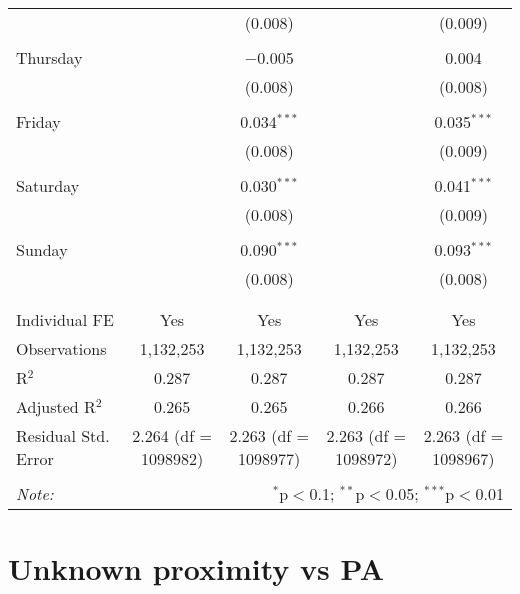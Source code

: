 \documentclass[
]{article}
\begin{document}
\begin{table}[!htbp]
{\begin{tabular}{@{\extracolsep{5pt}}lcccc}
  &  & (0.008) &  & (0.009) \\ 
  & & & & \\ 
 Thursday &  & $-$0.005 &  & 0.004 \\ 
  &  & (0.008) &  & (0.008) \\ 
  & & & & \\ 
 Friday &  & 0.034$^{***}$ &  & 0.035$^{***}$ \\ 
  &  & (0.008) &  & (0.009) \\ 
  & & & & \\ 
 Saturday &  & 0.030$^{***}$ &  & 0.041$^{***}$ \\ 
  &  & (0.008) &  & (0.009) \\ 
  & & & & \\ 
 Sunday &  & 0.090$^{***}$ &  & 0.093$^{***}$ \\ 
  &  & (0.008) &  & (0.008) \\ 
  & & & & \\ 
\hline \\[-1.8ex] 
Individual FE & Yes & Yes & Yes & Yes \\ 
Observations & 1,132,253 & 1,132,253 & 1,132,253 & 1,132,253 \\ 
R$^{2}$ & 0.287 & 0.287 & 0.287 & 0.287 \\ 
Adjusted R$^{2}$ & 0.265 & 0.265 & 0.266 & 0.266 \\ 
Residual Std. Error & 2.264 (df = 1098982) & 2.263 (df = 1098977) & 2.263 (df = 1098972) & 2.263 (df = 1098967) \\ 
\hline 
\hline \\[-1.8ex] 
\textit{Note:}  & \multicolumn{4}{r}{$^{*}$p$<$0.1; $^{**}$p$<$0.05; $^{***}$p$<$0.01} \\ 
\end{tabular}
} 
\end{table} 
\newpage
\section{Unknown proximity vs PA}
\end{document}
